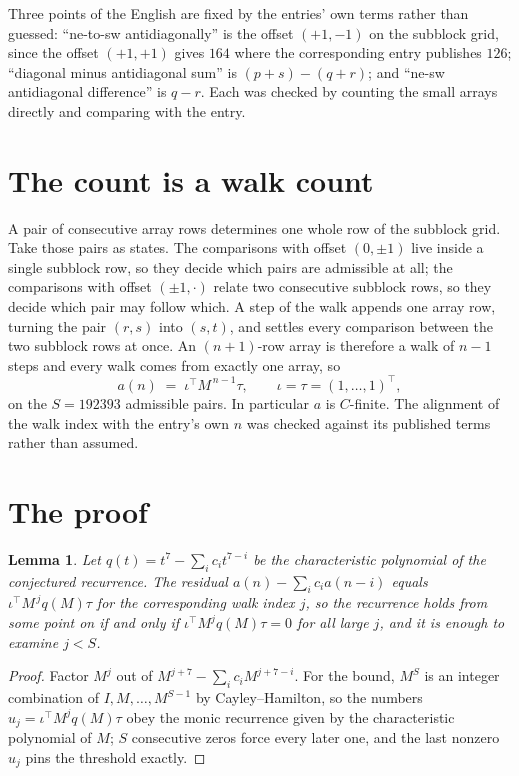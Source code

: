 \documentclass[11pt,a4paper]{article}
\theoremstyle{plain}
\newtheorem{lemma}[theorem]{Lemma}
\theoremstyle{definition}
\begin{document}
Three points of the English are fixed by the entries' own terms rather than guessed:
``ne-to-sw antidiagonally'' is the offset $(+1,-1)$ on the subblock grid, since the offset
$(+1,+1)$ gives $164$ where the corresponding entry publishes $126$; ``diagonal minus
antidiagonal sum'' is $(p+s)-(q+r)$; and ``ne-sw antidiagonal difference'' is $q-r$. Each was
checked by counting the small arrays directly and comparing with the entry.

\section{The count is a walk count}

A pair of consecutive array rows determines one whole row of the subblock grid. Take those
pairs as states. The comparisons with offset $(0,\pm1)$ live inside a single subblock row, so
they decide which pairs are admissible at all; the comparisons with offset $(\pm1,\cdot)$
relate two consecutive subblock rows, so they decide which pair may follow which. A step of the
walk appends one array row, turning the pair $(r,s)$ into $(s,t)$, and settles every comparison
between the two subblock rows at once. An $(n+1)$-row array is therefore a walk of $n-1$ steps
and every walk comes from exactly one array, so
\[
a(n)\;=\;\iota^{\!\top}M^{\,n-1}\tau,\qquad \iota=\tau=(1,\dots,1)^{\!\top},
\]
on the $S=192393$ admissible pairs. In particular $a$ is $C$-finite. The alignment of the walk
index with the entry's own $n$ was checked against its published terms rather than assumed.

\section{The proof}

\begin{lemma}\label{lem:crit}
Let $q(t)=t^{7}-\sum_i c_it^{7-i}$ be the characteristic polynomial of the
conjectured recurrence. The residual $a(n)-\sum_ic_ia(n-i)$ equals
$\iota^{\!\top}M^{\,j}q(M)\tau$ for the corresponding walk index $j$, so the recurrence
holds from some point on if and only if $\iota^{\!\top}M^{j}q(M)\tau=0$ for all large $j$,
and it is enough to examine $j<S$.
\end{lemma}

\begin{proof}
Factor $M^{j}$ out of $M^{j+7}-\sum_ic_iM^{j+7-i}$. For the bound, $M^{S}$
is an integer combination of $I,M,\dots,M^{S-1}$ by Cayley--Hamilton, so the numbers
$u_j=\iota^{\!\top}M^{j}q(M)\tau$ obey the monic recurrence given by the characteristic
polynomial of $M$; $S$ consecutive zeros force every later one, and the last nonzero $u_j$
pins the threshold exactly.
\end{proof}
\end{document}
